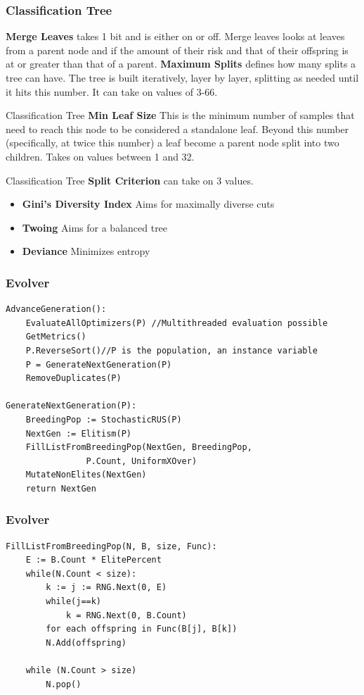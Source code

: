 \documentclass{beamer}
\begin{document}
\begin{frame}
	\frametitle{Classification Tree}
\textbf{Merge Leaves} takes 1 bit and is either on or off.  Merge leaves looks at leaves from a parent node and if the amount of their risk and that of their offspring is at or greater than that of a parent.\vspace{5mm}
\textbf{Maximum Splits} defines how many splits a tree can have.  The tree is built iteratively, layer by layer, splitting as needed until it hits this number.  It can take on values of 3-66.\\
\end{frame}
\begin{frame}{Classification Tree}
\textbf{Min Leaf Size} This is the minimum number of samples that need to reach this node to be considered a standalone leaf.  Beyond this number (specifically, at twice this number) a leaf become a parent node split into two children. Takes on values between 1 and 32.\\
\end{frame}

\begin{frame}{Classification Tree}
		\textbf{Split Criterion} can take on 3 values.
		\begin{itemize}
			\item \textbf{Gini's Diversity Index} Aims for maximally diverse cuts
			\item \textbf{Twoing} Aims for a balanced tree
			\item \textbf{Deviance} Minimizes entropy
		\end{itemize}
\end{frame}

\begin{frame}[fragile]
	\frametitle{Evolver}
	\begin{lstlisting}[language = algorithm, basicstyle=\scriptsize]
AdvanceGeneration():
	EvaluateAllOptimizers(P) //Multithreaded evaluation possible
	GetMetrics()
	P.ReverseSort()//P is the population, an instance variable
	P = GenerateNextGeneration(P)
	RemoveDuplicates(P)
	
GenerateNextGeneration(P):
	BreedingPop := StochasticRUS(P)
	NextGen := Elitism(P)
	FillListFromBreedingPop(NextGen, BreedingPop,
				P.Count, UniformXOver)
	MutateNonElites(NextGen)
	return NextGen
	\end{lstlisting}
\end{frame}

\begin{frame}[fragile]
	\frametitle{Evolver}
	\begin{lstlisting}[language = algorithm, basicstyle=\scriptsize]
	FillListFromBreedingPop(N, B, size, Func):
	E := B.Count * ElitePercent
	while(N.Count < size):
		k := j := RNG.Next(0, E)
		while(j==k) 
			k = RNG.Next(0, B.Count)
		for each offspring in Func(B[j], B[k])
		N.Add(offspring)
	
	while (N.Count > size)
		N.pop()
	\end{lstlisting}
	
\end{frame}
\end{document}
